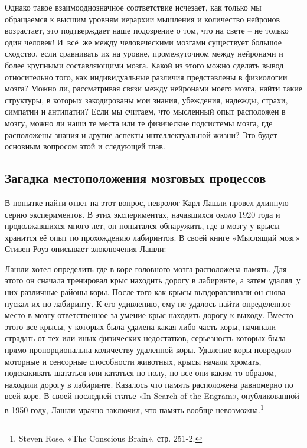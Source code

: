 \documentclass[../main.tex]{subfiles}
\begin{document}
Однако такое взаимооднозначное соответствие исчезает, как только мы обращаемся к высшим уровням иерархии мышления и количество нейронов возрастает, это подтверждает наше подозрение о том, что на свете \--- не только один человек! И~всё~же между человеческими мозгами существует большое сходство, если сравнивать их на уровне, промежуточном между нейронами и более крупными составляющими мозга. Какой из этого можно сделать вывод относительно того, как индивидуальные различия представлены в физиологии мозга? Можно ли, рассматривая связи между нейронами моего мозга, найти такие структуры, в которых закодированы мои знания, убеждения, надежды, страхи, симпатии и антипатии? Если мы считаем, что мысленный опыт расположен в мозгу, можно ли наши те места или те физические подсистемы мозга, где расположены знания и другие аспекты интеллектуальной жизни? Это будет основным вопросом этой и следующей глав.


\subsection{Загадка местоположения мозговых процессов}

В попытке найти ответ на этот вопрос, невролог Карл Лашли провел длинную серию экспериментов. В этих экспериментах, начавшихся около 1920 года и продолжавшихся много лет, он попытался обнаружить, где в мозгу у крысы хранится её опыт по прохождению лабиринтов. В своей книге «Мыслящий мозг» Стивен Роуз описывает злоключения Лашли:

Лашли хотел определить где в коре головного мозга расположена память. Для этого он сначала тренировал крыс находить дорогу в лабиринте, а затем удалял~у них различные районы коры. После того как крысы выздоравливали он снова пускал их по лабиринту. К его удивлению, ему не удалось найти определенное место в мозгу ответственное за умение крыс находить дорогу к выходу. Вместо этого все крысы, у которых была удалена какая-либо часть коры, начинали страдать от тех или иных физических недостатков, серьезность которых была прямо пропорциональна количеству удаленной коры. Удаление коры повредило моторные и сенсорные способности животных, крысы начали хромать, подскакивать шататься или кататься по полу, но все они каким то образом, находили дорогу в лабиринте. Казалось что память расположена равномерно по всей коре. В своей последней статье «In Search of the Engram», опубликованной в 1950 году, Лашли мрачно заключил, что память вообще невозможна.\footnote{Steven Rose, «The Conscious Brain», стр. 251-2.}
\end{document}
